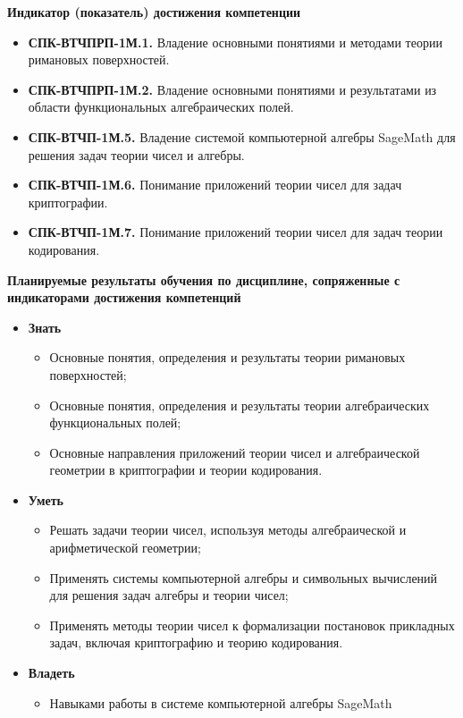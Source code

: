 \documentclass[a4paper, 12pt]{article}
\begin{document}
{\bf Индикатор (показатель) достижения компетенции}
\begin{itemize}[noitemsep,topsep=0pt]
    \item {\bf СПК-ВТЧПРП-1М.1.} Владение основными понятиями и методами теории римановых поверхностей.
    \item {\bf СПК-ВТЧПРП-1М.2.} Владение основными понятиями и результатами из области функциональных алгебраических полей.
    
    \item {\bf СПК-ВТЧП-1М.5.} Владение системой компьютерной алгебры SageMath для решения задач теории чисел и алгебры.
    \item {\bf СПК-ВТЧП-1М.6.} Понимание приложений теории чисел для задач криптографии.
    \item {\bf СПК-ВТЧП-1М.7.} Понимание приложений теории чисел для задач теории кодирования.
\end{itemize}

{\bf Планируемые результаты обучения по 
дисциплине, сопряженные с индикаторами   
достижения компетенций}
\begin{itemize}[noitemsep,topsep=0pt]
    \item {\bf Знать}
    \begin{itemize}[noitemsep,topsep=0pt]
        \item Основные понятия, определения и результаты теории римановых поверхностей;
        \item Основные понятия, определения и результаты теории алгебраических функциональных полей;
        \item Основные направления приложений теории чисел и алгебраической геометрии в криптографии и теории кодирования.
    \end{itemize}
    \item {\bf Уметь}
    \begin{itemize}[noitemsep,topsep=0pt]
        \item Решать задачи теории чисел, используя  методы алгебраической и арифметической геометрии;
        \item Применять системы компьютерной алгебры и символьных вычислений для решения задач алгебры и теории чисел;
        \item Применять методы теории чисел к формализации постановок прикладных задач, включая криптографию и теорию кодирования.
    \end{itemize}
    \item {\bf Владеть}
    \begin{itemize}[noitemsep,topsep=0pt]
        \item Навыками работы в системе компьютерной алгебры SageMath
    \end{itemize}
\end{itemize}
\end{document}
